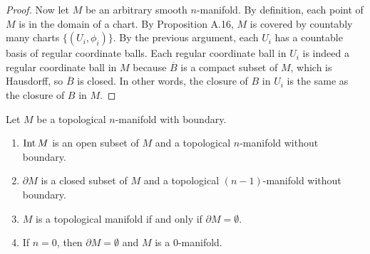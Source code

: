 \begin{proof}
  Now let $M$ be an arbitrary smooth $n$-manifold.
  By definition, each point of $M$ is in the domain of a chart.
  By Proposition A.16, $M$ is covered by countably many charts $\{ (U_i, \phi_i) \}$.
  By the previous argument, each $U_i$ has a countable basis of regular coordinate balls.
  Each regular coordinate ball in $U_i$ is indeed a regular coordinate ball in $M$ because $\overline{B}$ is a compact subset of $M$, which is Hausdorff, so $\overline{B}$ is closed.
  In other words, the closure of $B$ in $U_i$ is the same as the closure of $B$ in $M$.
\end{proof}

\begin{customexer}{1.39}\label{exercise_1_39}
  Let $M$ be a topological $n$-manifold with boundary.
  \begin{enumerate}[label=(\alph*)]
    \item
      $\operatorname{Int} M$ is an open subset of $M$ and a topological $n$-manifold without boundary.
    \item
      $\partial M$ is a closed subset of $M$ and a topological $(n - 1)$-manifold without boundary.
    \item
      $M$ is a topological manifold if and only if $\partial M = \emptyset$.
    \item
      If $n = 0$, then $\partial M = \emptyset$ and $M$ is a 0-manifold.
  \end{enumerate}
\end{customexer}

